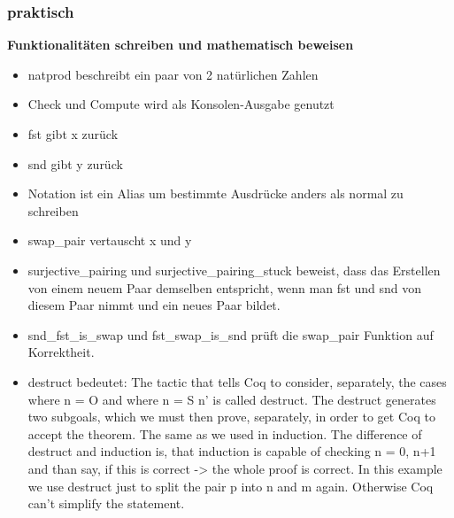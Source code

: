 \subsubsection{praktisch}
\textbf{Funktionalitäten schreiben und mathematisch beweisen}
\begin{itemize}
	\item natprod beschreibt ein paar von 2 natürlichen Zahlen
	\item Check und Compute wird als Konsolen-Ausgabe genutzt
	\item fst gibt x zurück
	\item snd gibt y zurück
	\item Notation ist ein Alias um bestimmte Ausdrücke anders als normal zu schreiben
	\item swap\_pair vertauscht x und y
	\item surjective\_pairing und surjective\_pairing\_stuck beweist, dass das Erstellen von einem neuem Paar demselben entspricht, wenn man fst und snd von diesem Paar nimmt und ein neues Paar bildet.
	\item snd\_fst\_is\_swap und fst\_swap\_is\_snd prüft die swap\_pair Funktion auf Korrektheit.
	\item destruct bedeutet: The tactic that tells Coq to consider, separately, the cases where n = O and where n = S n' is called destruct. The destruct generates two subgoals, which we must then prove, separately, in order to get Coq to accept the theorem. The same as we used in induction. The difference of destruct and induction is, that induction is capable of checking n = 0, n+1 and than say, if this is correct -> the whole proof is correct. In this example we use destruct just to split the pair p into n and m again. Otherwise Coq can't simplify the statement.
\end{itemize}

